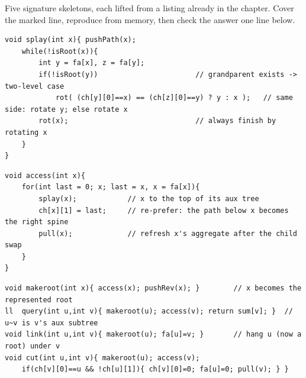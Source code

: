 
Five signature skeletons, each lifted from a listing already in the chapter. Cover the marked line,
reproduce from memory, then check the answer one line below.

\begin{lstlisting}[caption={Drill 1 -- splay step: decide zig-zig vs zig-zag, then rotate (from lst:c23-splay-rot)}]
void splay(int x){ pushPath(x);
    while(!isRoot(x)){
        int y = fa[x], z = fa[y];
        if(!isRoot(y))                       // grandparent exists -> two-level case
            rot( (ch[y][0]==x) == (ch[z][0]==y) ? y : x );   // same side: rotate y; else rotate x
        rot(x);                              // always finish by rotating x
    }
}
\end{lstlisting}

\begin{lstlisting}[caption={Drill 2 -- the access loop: the whole engine in four lines (from lst:c23-lct-core)}]
void access(int x){
    for(int last = 0; x; last = x, x = fa[x]){
        splay(x);            // x to the top of its aux tree
        ch[x][1] = last;     // re-prefer: the path below x becomes the right spine
        pull(x);             // refresh x's aggregate after the child swap
    }
}
\end{lstlisting}

\begin{lstlisting}[caption={Drill 3 -- evert and read a path fold (from lst:c23-evert)}]
void makeroot(int x){ access(x); pushRev(x); }        // x becomes the represented root
ll  query(int u,int v){ makeroot(u); access(v); return sum[v]; }  // u~v is v's aux subtree
void link(int u,int v){ makeroot(u); fa[u]=v; }       // hang u (now a root) under v
void cut(int u,int v){ makeroot(u); access(v);
    if(ch[v][0]==u && !ch[u][1]){ ch[v][0]=0; fa[u]=0; pull(v); } }
\end{lstlisting}

